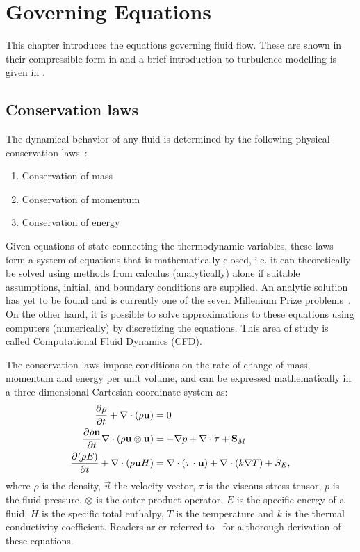 \chapter{Governing Equations}
\label{chap:governing}
This chapter introduces the  equations governing fluid flow.
These are shown in their compressible form in  and
a brief introduction to turbulence modelling is given in .
\section{Conservation laws}
\label{sec:ns}
The dynamical behavior of any fluid is determined by the following physical conservation laws~\cite{blazek2015computational}:
\begin{enumerate}
    \item Conservation of mass
    \item Conservation of momentum
    \item Conservation of energy
\end{enumerate}
Given equations of state connecting the thermodynamic variables, these laws form a system of equations that is mathematically closed, i.e. it can theoretically be solved using methods from calculus (analytically) alone if suitable assumptions, initial, and boundary conditions are supplied. An analytic solution has yet to be found and is currently one of the seven Millenium Prize problems~\cite{carlson2006millennium}. On the other hand, it is possible to solve approximations to these equations using computers (numerically) by discretizing the equations. This area of study is called Computational Fluid Dynamics (CFD).

The conservation laws impose conditions on the rate of change of mass, momentum and energy per unit volume, and can be expressed mathematically in a three-dimensional Cartesian coordinate system as:
\begin{align}
     \frac{\partial \rho}{\partial t}  + \nabla \cdot
        (\rho\mathbf{u}) &= 0 \label{eq:mass}
    \\
     \frac{\partial \rho\mathbf{u}}{\partial t}  \nabla\cdot(\rho\mathbf{u}\otimes\mathbf{u}) &= -\nabla p
     + \nabla \cdot \tau
     + \mathbf{S}_{M}
     \label{eq:mom}
     \\
     \frac{\partial (\rho E)}{\partial t}  + \nabla\cdot(\rho\mathbf{u}H) &=
      \nabla\cdot(\tau\cdot\mathbf{u}) + \nabla\cdot(k\nabla T)
         + S_E
     \label{eq:energy},
\end{align}
where $\rho$ is the density, $\vec{u}$ the velocity vector, $\tau$ is the viscous stress tensor, $p$ is the fluid pressure, $\otimes$ is the outer product operator, $E$ is the specific energy of a fluid, $H$ is the specific total enthalpy, $T$ is the temperature and $k$ is the thermal conductivity coefficient. Readers ar er referred to~\cite{munson2012fundamentals} for a thorough derivation of these equations.

